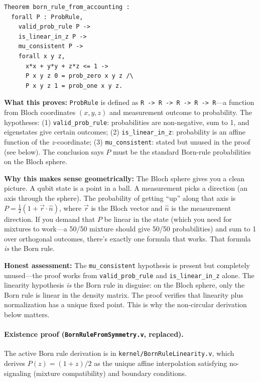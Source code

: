 \begin{lstlisting}
Theorem born_rule_from_accounting :
  forall P : ProbRule,
    valid_prob_rule P ->
    is_linear_in_z P ->
    mu_consistent P ->
    forall x y z,
      x*x + y*y + z*z <= 1 ->
      P x y z 0 = prob_zero x y z /\
      P x y z 1 = prob_one x y z.
\end{lstlisting}

\textbf{What this proves:} \texttt{ProbRule} is defined as \texttt{R -> R -> R -> R -> R}---a function from Bloch coordinates $(x,y,z)$ and measurement outcome to probability. The hypotheses: (1) \texttt{valid\_prob\_rule}: probabilities are non-negative, sum to 1, and eigenstates give certain outcomes; (2) \texttt{is\_linear\_in\_z}: probability is an affine function of the $z$-coordinate; (3) \texttt{mu\_consistent}: stated but unused in the proof (see below). The conclusion says $P$ must be the standard Born-rule probabilities on the Bloch sphere.

\textbf{Why this makes sense geometrically:} The Bloch sphere gives you a clean picture. A qubit state is a point in a ball. A measurement picks a direction (an axis through the sphere). The probability of getting ``up'' along that axis is $P = \frac{1}{2}(1 + \vec{r} \cdot \hat{n})$, where $\vec{r}$ is the Bloch vector and $\hat{n}$ is the measurement direction. If you demand that $P$ be linear in the state (which you need for mixtures to work---a 50/50 mixture should give 50/50 probabilities) and sum to 1 over orthogonal outcomes, there's exactly one formula that works. That formula \textit{is} the Born rule.

\textbf{Honest assessment:} The \texttt{mu\_consistent} hypothesis is present but completely unused---the proof works from \texttt{valid\_prob\_rule} and \texttt{is\_linear\_in\_z} alone. The linearity hypothesis \textit{is} the Born rule in disguise: on the Bloch sphere, only the Born rule is linear in the density matrix. The proof verifies that linearity plus normalization has a unique fixed point. This is why the non-circular derivation below matters.

\paragraph{Existence proof (\texttt{BornRuleFromSymmetry.v}, replaced).}
The active Born rule derivation is in \texttt{kernel/BornRuleLinearity.v}, which derives $P(z) = (1+z)/2$ as the unique affine interpolation satisfying no-signaling (mixture compatibility) and boundary conditions.


